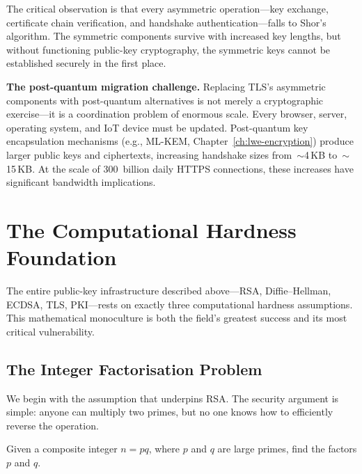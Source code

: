 The critical observation is that every asymmetric operation---key exchange, certificate chain verification, and handshake authentication---falls to Shor's algorithm.  The symmetric components survive with increased key lengths, but without functioning public-key cryptography, the symmetric keys cannot be established securely in the first place.

\begin{svgraybox}
\textbf{The post-quantum migration challenge.}
Replacing TLS's asymmetric components with post-quantum alternatives is not merely a cryptographic exercise---it is a coordination problem of enormous scale.  Every browser, server, operating system, and IoT device must be updated.  Post-quantum key encapsulation mechanisms (e.g., ML-KEM, Chapter~\ref{ch:lwe-encryption}) produce larger public keys and ciphertexts, increasing handshake sizes from~$\sim$4\,KB to~$\sim$15\,KB.  At the scale of 300~billion daily HTTPS connections, these increases have significant bandwidth implications.
\end{svgraybox}


\section{The Computational Hardness Foundation}
\label{sec:hardness}

The entire public-key infrastructure described above---RSA, Diffie--Hellman, ECDSA, TLS, PKI---rests on exactly three computational hardness assumptions.  This mathematical monoculture is both the field's greatest success and its most critical vulnerability.

\subsection{The Integer Factorisation Problem}
\label{subsec:ifp}

We begin with the assumption that underpins RSA.  The security argument is simple: anyone can multiply two primes, but no one knows how to efficiently reverse the operation.

\begin{definition}
\label{def:ifp}
Given a composite integer $n = pq$, where $p$ and $q$ are large primes, find the factors $p$ and $q$.
\end{definition}

